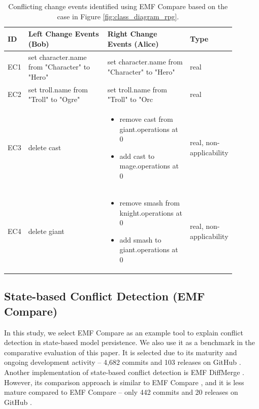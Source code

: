 \begin{table}[ht]
  \centering
  \caption{Conflicting change events identified using EMF Compare based on the case in Figure \ref{fig:class_diagram_rpg}.}
  \label{table:emfc_conflicts}
  \begin{tabular}{|p{0.04\linewidth}|p{0.37\linewidth}|p{0.37\linewidth}|
      p{0.11\linewidth}|}
    \hline
    \textbf{ID} & 
    \textbf{Left Change Events (Bob)} & 
    \textbf{Right Change Events (Alice)} & 
    \textbf{Type}\\ 
    \hline
    EC1 & 
    set character.name from "Character" to "Hero" & 
    set character.name from "Character" to "Hero" & 
    real \\
    \hline
    EC2 & set troll.name from "Troll" to "Ogre" & 
    set troll.name from "Troll" to "Orc & 
    real \\ 
    \hline
    EC3 & 
    delete cast
    & 
    \begin{minipage}[t]{\linewidth}
      \raggedright
      \begin{itemize}[leftmargin=0pt]
        \setlength
        \item[] remove cast from giant.operations at 0
        \item[] add cast to mage.operations at 0
      \end{itemize}
    \end{minipage}
    & 
    real, non-applicability\\
    \hline
    EC4 & 
    delete giant
    & 
    \begin{minipage}[t]{\linewidth}
      \raggedright
      \begin{itemize}[leftmargin=0pt]
        \setlength
        \item[] remove smash from knight.operations at 0
        \item[] add smash to giant.operations at 0
      \end{itemize}
    \end{minipage}
    & 
    real, non-applicability\\
    \hline
  \end{tabular}
\end{table}

\subsection{State-based Conflict Detection (EMF Compare)}
\label{sec:emfcompare_conflict_detection}

In this study, we select EMF Compare \cite{emfcompare2018developer} as an example tool to explain conflict detection in state-based model persistence. We also use it as a benchmark in the comparative evaluation of this paper. It is selected due to its maturity and ongoing development activity -- 4,682 commits and 103 releases on GitHub \cite{github2019emfcompare}. Another implementation of state-based conflict detection is EMF DiffMerge \cite{eclipse2019emfdiffmerge}. However, its comparison approach is similar to EMF Compare \cite{eclipse2019emfdiffmerge}, and it is less mature compared to EMF Compare -- only 442 commits and 20 releases on GitHub \cite{github2019emfdiffmerge}.
 
